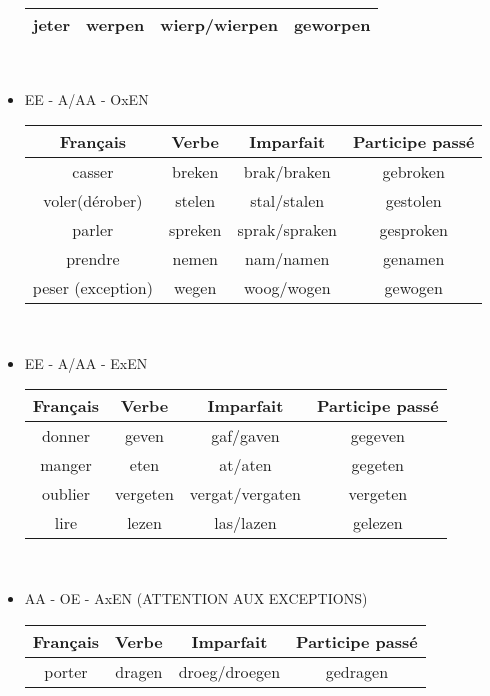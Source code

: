 \documentclass[a4paper]{article}
\begin{document}
\begin{itemize}[label=\textbullet, font=\Large]
\begin{center}
\begin{tabular}{|c|c|c|c|}
      \hline
      jeter & werpen & wierp/wierpen & geworpen\\
      \hline
    \end{tabular}\\
  \end{center}
  \item EE - A/AA - OxEN
  \begin{center}
    \begin{tabular}{|c|c|c|c|}
      \hline
      \textbf{Français} & \textbf{Verbe} & \textbf{Imparfait} & \textbf{Participe passé}\\
      \hline
      casser & breken & brak/braken & gebroken\\
      \hline
      voler(dérober) & stelen & stal/stalen & gestolen\\
      \hline
      parler & spreken & sprak/spraken & gesproken\\
      \hline
      prendre & nemen & nam/namen & genamen\\
      \hline
      peser (exception) & wegen & woog/wogen & gewogen\\
      \hline
    \end{tabular}\\
  \end{center}
  \item EE - A/AA - ExEN
  \begin{center}
    \begin{tabular}{|c|c|c|c|}
      \hline
      \textbf{Français} & \textbf{Verbe} & \textbf{Imparfait} & \textbf{Participe passé}\\
      \hline
      donner & geven & gaf/gaven & gegeven\\
      \hline
      manger & eten & at/aten & gegeten\\
      \hline
      oublier & vergeten & vergat/vergaten & vergeten\\
      \hline
      lire & lezen & las/lazen & gelezen\\
      \hline
    \end{tabular}\\
  \end{center}
  \item AA - OE - AxEN (ATTENTION AUX EXCEPTIONS)
  \begin{center}
    \begin{tabular}{|c|c|c|c|}
      \hline
      \textbf{Français} & \textbf{Verbe} & \textbf{Imparfait} & \textbf{Participe passé}\\
      \hline
      porter & dragen & droeg/droegen & gedragen\\

\end{tabular}
\end{center}
\end{itemize}
\end{document}
